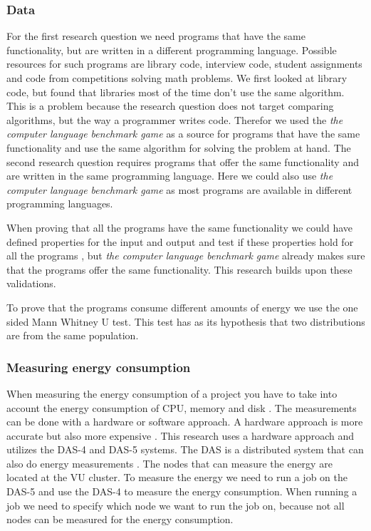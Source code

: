 \subsubsection{Data}
For the first research question we need programs that have the same functionality, but are written in a different programming language. Possible resources for such programs are library code, interview code, student assignments and code from competitions solving math problems. We first looked at library code, but found that libraries most of the time don't use the same algorithm. This is a problem because the research question does not target comparing algorithms, but the way a programmer writes code. Therefor we used the \textit{the computer language benchmark game} \cite{gouy:2019} as a source for programs that have the same functionality and use the same algorithm for solving the problem at hand. The second research question requires programs that offer the same functionality and are written in the same programming language. Here we could also use \textit{the computer language benchmark game} as most programs are available in different programming languages.

When proving that all the programs have the same functionality we could have defined properties for the input and output and test if these properties hold for all the programs \cite{mens2004survey}, but \textit{the computer language benchmark game} already makes sure that the programs offer the same functionality. This research builds upon these validations.

To prove that the programs consume different amounts of energy we use the one sided Mann Whitney U test. This test has as its hypothesis that two distributions are from the same population.

\subsubsection{Measuring energy consumption}
When measuring the energy consumption of a project you have to take into account the energy consumption of CPU, memory and disk \cite{acar2016impact}. The measurements can be done with a hardware or software approach. A hardware approach is more accurate but also more expensive \cite{acar2016impact}. This research uses a hardware approach and utilizes the DAS-4 and DAS-5 systems. The DAS is a distributed system that can also do energy measurements \cite{bal2016medium}. The nodes that can measure the energy are located at the VU cluster. To measure the energy we need to run a job on the DAS-5 and use the DAS-4 to measure the energy consumption. When running a job we need to specify which node we want to run the job on, because not all nodes can be measured for the energy consumption. 

